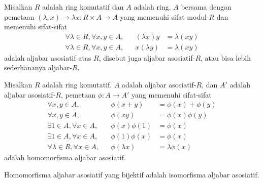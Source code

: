 \begin{samepage}
\begin{defn}
Misalkan $R$ adalah ring komutatif dan $A$ adalah ring. $A$ bersama dengan pemetaan ${(\lambda, x) \to \lambda x : R \times A \to A}$ yang memenuhi sifat modul-$R$ dan memenuhi sifat-sifat
\begin{align*}
	\forall \lambda \in R, \forall x,y \in A,&& (\lambda x)y &= \lambda(xy) \label{eq:aa1} \\
	\forall \lambda \in R, \forall x,y \in A,&& x(\lambda y) &= \lambda(xy) \label{eq:aa2}
\end{align*}
adalah aljabar asosiatif atas $R$, disebut juga aljabar asosiatif-$R$, atau bisa lebih sederhananya aljabar-$R$.
\end{defn}
\end{samepage}


\begin{defn}
Misalkan $R$ adalah ring komutatif, $A$ adalah aljabar asosiatif-$R$, dan $A'$ adalah aljabar asosiatif-$R$, pemetaan ${\phi : A \to A'}$ yang memenuhi sifat-sifat
\begin{align*}
	\forall x,y \in A,&& \phi(x + y) &= \phi(x) + \phi(y) \\
	\forall x,y \in A,&& \phi(xy) &= \phi(x)\phi(y) \\
	\exists 1 \in A, \forall x \in A,&& \phi(x)\phi(1) &= \phi(x) \\
	\exists 1 \in A, \forall x \in A,&& \phi(1)\phi(x) &= \phi(x) \\
	\forall \lambda \in R, \forall x \in A,&& \phi(\lambda x) &= \lambda\phi(x)
\end{align*}
adalah homomorfisma aljabar asosiatif.
\end{defn}

\begin{defn}
Homomorfisma aljabar asosiatif yang bijektif adalah isomorfisma aljabar asosiatif.
\end{defn}

